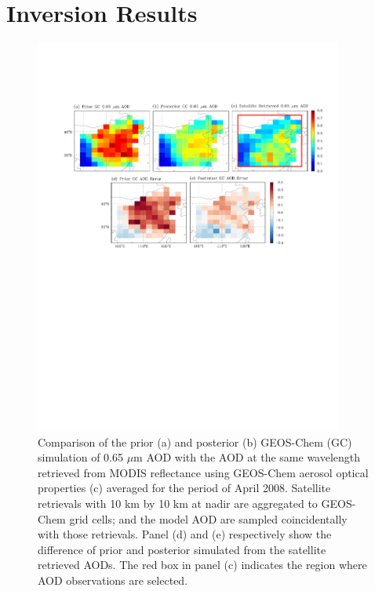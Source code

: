 \section{Inversion Results}

 \begin{figure}[h]
  \centering
  \includegraphics[width={0.9\textwidth}]{figures/a3.pdf}
  \caption{Comparison of the prior (a) and posterior (b) GEOS-Chem (GC) simulation 
 of 0.65 $\mu$m AOD with the AOD at the same wavelength retrieved from 
 MODIS reflectance using GEOS-Chem aerosol optical properties (c) averaged 
 for the period of April 2008. Satellite retrievals with 10 km by 10 km at nadir 
 are aggregated to GEOS-Chem grid cells; and the model AOD are sampled coincidentally 
 with those retrievals. Panel (d) and (e) respectively show the difference of 
 prior and posterior simulated from the satellite retrieved AODs. 
 The red box in panel (c) indicates the region where AOD observations are selected.}
  \label{fig:aods1}
 \end{figure}


